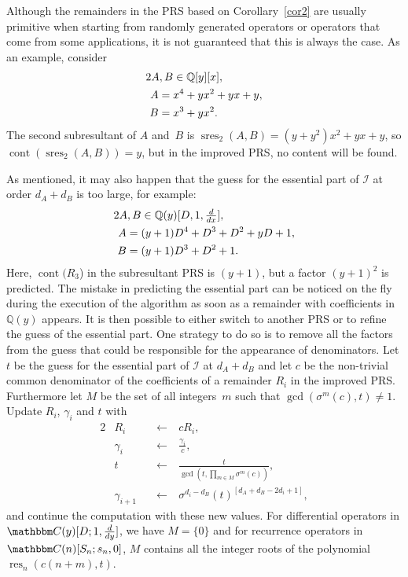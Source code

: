 \documentclass[3p,11pt,preprint]{elsarticle}
\let\set\mathbbm
\newcommand{\cont}{\operatorname{cont}}
\newcommand{\pres}{\operatorname{sres}}
\begin{document}
\begin{example}
 Although the remainders in the PRS based on Corollary~\ref{cor2} are usually primitive when starting from randomly generated operators or operators that come from some applications, it is not guaranteed that this is always the case. As an example, consider 
\begin{alignat*}2
 \text{\rlap{$A,B\in\mathbb{Q}[y][x],$}}\ \ & \\
 A &= x^4+yx^2+yx+y,\\
 B &= x^3+yx^2.
\end{alignat*}
The second subresultant of $A$ and~$B$ is $\pres_2(A,B)=(y+y^2)x^2+yx+y$, so $\cont(\pres_2(A,B))=y$, but in the improved PRS, no content will be found. 

As mentioned, it may also happen that the guess for the essential part of $\mathcal{I}$ at order $d_A+d_B$ is too large, for example:
\begin{alignat*}2
 \text{\rlap{$A,B\in\mathbb{Q}(y)[D,1,\tfrac{d}{dx}],$}}\ \ & \\
 A&=(y + 1)D^4 + D^3 + D^2 + yD + 1,\\
 B&=(y + 1)D^3 + D^2 + 1.
\end{alignat*}
Here, $\operatorname{cont}(R_3$) in the subresultant PRS is $(y+1)$, but a factor $(y+1)^2$ is predicted. The mistake in predicting the essential part can be noticed on the fly during the execution of the algorithm as soon as a remainder with coefficients in $\mathbb{Q}(y)$ appears. It is then possible to either switch to another PRS or to refine the guess of the essential part. One strategy to do so is to remove all the factors from the guess that could be responsible for the appearance of denominators. Let $t$ be the guess for the essential part of $\mathcal{I}$ at $d_A+d_B$ and let $c$ be the non-trivial common denominator of the coefficients of a remainder $R_i$ in the improved PRS. Furthermore let $M$ be the set of all integers~$m$ such that $\gcd(\sigma^m(c),t)\neq 1$. Update $R_i$, $\gamma_i$ and $t$ with
\begin{alignat*}2
 & R_i & \leftarrow &\ cR_i,\\
 & \gamma_i & \leftarrow &\ \frac{\gamma_i}{c},\\
 & t & \leftarrow &\ \frac{t}{\gcd(t,\prod_{m\in M}{\sigma^m(c)})},\\
 & \gamma_{i+1}\quad & \leftarrow &\ \sigma^{d_{i}-d_B}(t)^{[d_A+d_B-2d_{i}+1]},
\end{alignat*}
and continue the computation with these new values. For differential operators in $\set C(y)[D;1,\frac{d}{dy}]$, we have $M=\{0\}$ and for recurrence operators in $\set C(n)[S_n;s_n,0]$, $M$ contains all the integer roots of the polynomial $\operatorname{res}_n(c(n+m),t)$.
\end{example}
\end{document}
